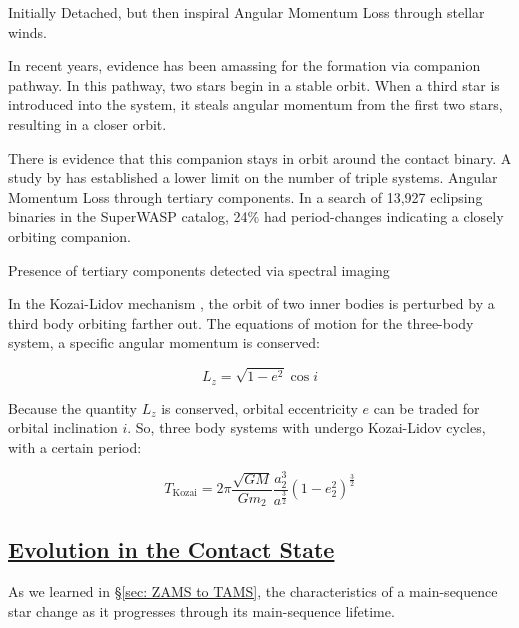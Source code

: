 \documentclass[12pt]{article} %
\numberwithin{equation}{section} %
\begin{document}
\citep{yildiz2013origin}

\citep{bilir2005kinematics}

\citep{li2007formation}

Initially Detached, but then inspiral
Angular Momentum Loss through stellar winds. 

In recent years, evidence has been amassing for the formation via companion pathway. In this pathway, two stars begin in a stable orbit. When a third star is introduced into the system, it steals angular momentum from the first two stars, resulting in a closer orbit. 

There is evidence that this companion stays in orbit around the contact binary.
A study by \citet{pribulla2006contact} has established a lower limit on the number of triple systems. Angular Momentum Loss through tertiary components.  \citep{lohr2015orbital} In a search of 13,927 eclipsing binaries in the SuperWASP catalog, 24\% had period-changes indicating a closely orbiting companion.

Presence of tertiary components detected via spectral imaging \citep{hendry1998detection}

In the Kozai-Lidov mechanism , the orbit of two inner bodies is perturbed by a third body orbiting farther out. The equations of motion for the three-body system, a specific angular momentum is conserved:

\begin{equation} \label{kozai_1}
L_{z} = \sqrt{1- e^{2}} \cos i
\end{equation}

Because the quantity $L_{z}$ is conserved, orbital eccentricity $e$ can be traded for orbital inclination $i$. So, three body systems with undergo Kozai-Lidov cycles, with a certain period:

\begin{equation} \label{kozai_2}
T_{\text{Kozai}} = 2 \pi \frac{\sqrt{GM}}{G m_{2}} \frac{a_{2}^{3}}{a^{\frac{3}{2}}} (1 - e^{2}_{2})^{\frac{3}{2}}
\end{equation}

\subsection[Evolution in the Contact State]{\hyperlink{toc}{Evolution in the Contact State}}

As we learned in \S\ref{sec: ZAMS to TAMS}, the characteristics of a main-sequence star change as it progresses through its main-sequence lifetime. 
\end{document}
